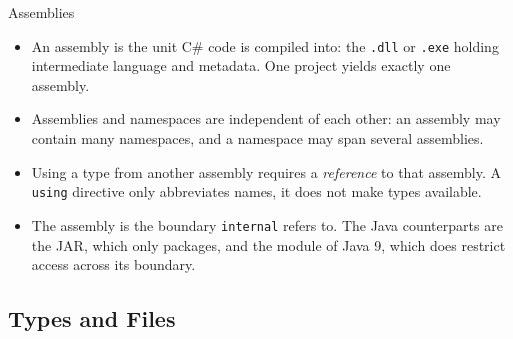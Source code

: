 \begin{frame}{Assemblies}
  \begin{itemize}
    \item An assembly is the unit C\# code is compiled into: the \texttt{.dll}
      or \texttt{.exe} holding intermediate language and metadata. One project
      yields exactly one assembly.
    \item Assemblies and namespaces are independent of each other: an assembly
      may contain many namespaces, and a namespace may span several assemblies.
    \item Using a type from another assembly requires a \emph{reference} to
      that assembly. A \texttt{using} directive only abbreviates names, it does
      not make types available.
    \item The assembly is the boundary \texttt{internal} refers to. The Java
      counterparts are the JAR, which only packages, and the module of Java 9,
      which does restrict access across its boundary.
  \end{itemize}
  \vspace{1ex}

\end{frame}

\subsection{Types and Files}

